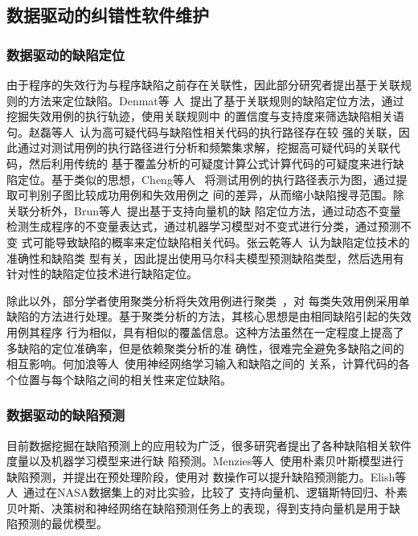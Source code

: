 \subsection{数据驱动的纠错性软件维护}

\subsubsection{数据驱动的缺陷定位}
由于程序的失效行为与程序缺陷之前存在关联性，因此部分研究者提出基于关联规则的方法来定位缺陷。Denmat等
人~\cite{denmat2005data}提出了基于关联规则的缺陷定位方法，通过挖掘失效用例的执行轨迹，使用关联规则中
的置信度与支持度来筛选缺陷相关语句。赵磊等人~\cite{zl}认为高可疑代码与缺陷性相关代码的执行路径存在较
强的关联，因此通过对测试用例的执行路径进行分析和频繁集求解，挖掘高可疑代码的关联代码，然后利用传统的
基于覆盖分析的可疑度计算公式计算代码的可疑度来进行缺陷定位。基于类似的思想，Cheng等人
~\cite{cheng2009identifying}将测试用例的执行路径表示为图，通过提取可判别子图比较成功用例和失效用例之
间的差异，从而缩小缺陷搜寻范围。除关联分析外，Brun等人~\cite{brun2004finding}提出基于支持向量机的缺
陷定位方法，通过动态不变量检测生成程序的不变量表达式，通过机器学习模型对不变式进行分类，通过预测不变
式可能导致缺陷的概率来定位缺陷相关代码。张云乾等人~\cite{malcov2013}认为缺陷定位技术的准确性和缺陷类
型有关，因此提出使用马尔科夫模型预测缺陷类型，然后选用有针对性的缺陷定位技术进行缺陷定位。

除此以外，部分学者使用聚类分析将失效用例进行聚类~\cite{jones2007debugging, zheng2006statistical}，对
每类失效用例采用单缺陷的方法进行处理。基于聚类分析的方法，其核心思想是由相同缺陷引起的失效用例其程序
行为相似，具有相似的覆盖信息。这种方法虽然在一定程度上提高了多缺陷的定位准确率，但是依赖聚类分析的准
确性，很难完全避免多缺陷之间的相互影响。何加浪等人~\cite{neural2013}使用神经网络学习输入和缺陷之间的
关系，计算代码的各个位置与每个缺陷之间的相关性来定位缺陷。

\subsubsection{数据驱动的缺陷预测}

目前数据挖掘在缺陷预测上的应用较为广泛，很多研究者提出了各种缺陷相关软件度量以及机器学习模型来进行缺
陷预测。Menzies等人~\cite{menzies2007data}使用朴素贝叶斯模型进行缺陷预测，并提出在预处理阶段，使用对
数操作可以提升缺陷预测能力。Elish等人~\cite{elish2008predicting}通过在NASA数据集上的对比实验，比较了
支持向量机、逻辑斯特回归、朴素贝叶斯、决策树和神经网络在缺陷预测任务上的表现，得到支持向量机是用于缺
陷预测的最优模型。

